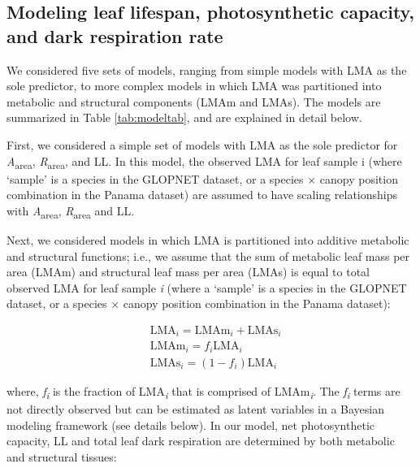 \documentclass[
  12pt,
]{article}
\begin{document}
\hypertarget{modeling-leaf-lifespan-photosynthetic-capacity-and-dark-respiration-rate}{%
\subsection{Modeling leaf lifespan, photosynthetic capacity, and dark respiration rate}\label{modeling-leaf-lifespan-photosynthetic-capacity-and-dark-respiration-rate}}

We considered five sets of models, ranging from simple models with LMA as the sole predictor, to more complex models in which LMA was partitioned into metabolic and structural components (LMAm and LMAs).
The models are summarized in Table \ref{tab:modeltab}, and are explained in detail below.

First, we considered a simple set of models with LMA as the sole predictor for \emph{A}\textsubscript{area}, \emph{R}\textsubscript{area}, and LL.
In this model, the observed LMA for leaf sample i (where `sample' is a species in the GLOPNET dataset, or a species \(\times\) canopy position combination in the Panama dataset) are assumed to have scaling relationships with \emph{A}\textsubscript{area}, \emph{R}\textsubscript{area} and LL.

Next, we considered models in which LMA is partitioned into additive metabolic and structural functions; i.e., we assume that the sum of metabolic leaf mass per area (LMAm) and structural leaf mass per area (LMAs) is equal to total observed LMA for leaf sample \emph{i} (where a `sample' is a species in the GLOPNET dataset, or a species × canopy position combination in the Panama dataset):

\begin{align}
  &\mathrm{LMA}_{i} =\mathrm{LMAm}_{i} + \mathrm{LMAs}_{i} \label{eq:LMA}\\
  &\mathrm{LMAm}_{i} = f_{i} \mathrm{LMA}_{i} \label{eq:LMAm}\\
  &\mathrm{LMAs}_{i} = (1 - f_{i})  \mathrm{LMA}_{i}\label{eq:LMAs}
\end{align}

where, \emph{f\textsubscript{i}} is the fraction of LMA\textsubscript{\emph{i}} that is comprised of LMAm\textsubscript{\emph{i}}.
The \emph{f\textsubscript{i}} terms are not directly observed but can be estimated as latent variables in a Bayesian modeling framework (see details below).
In our model, net photosynthetic capacity, LL and total leaf dark respiration are determined by both metabolic and structural tissues:
\end{document}

